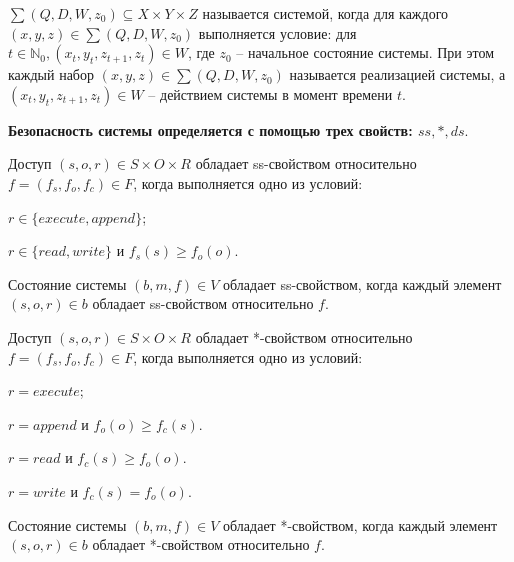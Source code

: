 \begin{defs}[Система]
		$\sum (Q,D,W,z_0) \subseteq X \times Y \times Z$ называется системой, когда для каждого $(x,y,z) \in \sum (Q,D,W,z_0)$ выполняется условие: для $t \in \mathbb{N}_0, (x_t, y_t, z_{t+1}, z_t) \in W$, где
		$z_0$ -- начальное состояние системы. При этом каждый набор $(x,y,z) \in \sum (Q,D,W,z_0)$ называется реализацией системы, а $(x_t, y_t, z_{t+1}, z_t) \in W$ -- действием системы в момент времени $t$.
\end{defs}

\textbf{Безопасность системы определяется с помощью трех свойств: $ss, *, ds$}.

\begin{defs}
	Доступ $(s,o,r) \in S \times O \times R$ обладает ss-свойством относительно $f = (f_s, f_o, f_c) \in F$, когда выполняется одно из условий:
	\begin{itemize*}
		\item $r \in \{execute, append\}$;
		\item $r \in \{read, write\}$ и $f_s(s) \geqslant f_o(o)$.
	\end{itemize*}
\end{defs}

\begin{defs}
	Состояние системы $(b,m,f) \in V$ обладает ss-свойством, когда каждый элемент $(s,o,r) \in b$ обладает ss-свойством относительно $f$.
\end{defs}

\begin{defs}
	Доступ $(s,o,r) \in S \times O \times R$ обладает *-свойством относительно $f = (f_s, f_o, f_c) \in F$, когда выполняется одно из условий:
	\begin{itemize*}
		\item $r = execute$;
		\item $r = append$ и $f_o(o) \geqslant f_c(s)$.
		\item $r = read$ и $f_c(s) \geqslant f_o(o)$.
		\item $r = write$ и $f_c(s) = f_o(o)$.
	\end{itemize*}
\end{defs}

\begin{defs}
	Состояние системы $(b,m,f) \in V$ обладает *-свойством, когда каждый элемент $(s,o,r) \in b$ обладает *-свойством относительно $f$.
\end{defs}

